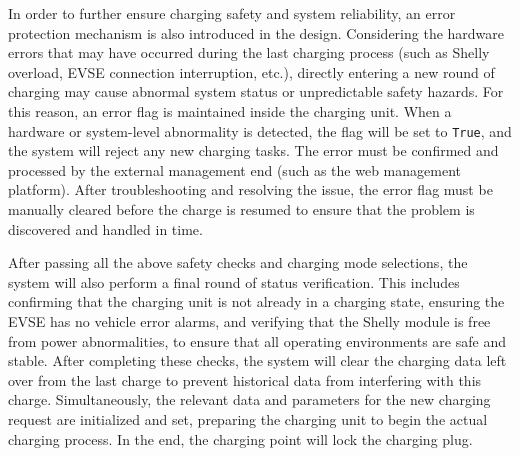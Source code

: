 \documentclass[
	english,
	ruledheaders=section,%
	class=report,%
	thesis={type=Report},%
	accentcolor=9c,%
	custommargins=true,%
	marginpar=false,%
	parskip=half-,%
	fontsize=11pt,%
	logofile={img/tuda_logo.pdf}, %
]{tudapub}
\begin{document}
\begin{enumerate}[label=\Alph*.]

    In order to further ensure charging safety and system reliability, an error protection mechanism is also introduced in the design. Considering the hardware errors that may have occurred during the last charging process (such as Shelly overload, EVSE connection interruption, etc.), directly entering a new round of charging may cause abnormal system status or unpredictable safety hazards. For this reason, an error flag is maintained inside the charging unit. When a hardware or system-level abnormality is detected, the flag will be set to \texttt{True}, and the system will reject any new charging tasks. The error must be confirmed and processed by the external management end (such as the web management platform). After troubleshooting and resolving the issue, the error flag must be manually cleared before the charge is resumed to ensure that the problem is discovered and handled in time.
    
    After passing all the above safety checks and charging mode selections, the system will also perform a final round of status verification. This includes confirming that the charging unit is not already in a charging state, ensuring the EVSE has no vehicle error alarms, and verifying that the Shelly module is free from power abnormalities, to ensure that all operating environments are safe and stable. After completing these checks, the system will clear the charging data left over from the last charge to prevent historical data from interfering with this charge. Simultaneously, the relevant data and parameters for the new charging request are initialized and set, preparing the charging unit to begin the actual charging process. In the end, the charging point will lock the charging plug.


\end{enumerate}
\end{document}
